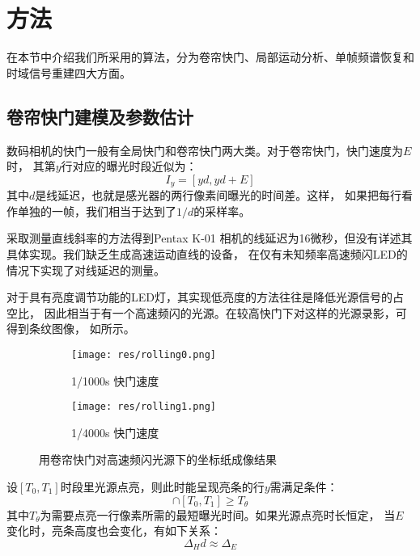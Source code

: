 
\section{方法}

在本节中介绍我们所采用的算法，分为卷帘快门、局部运动分析、单帧频谱恢复和
时域信号重建四大方面。

\subsection{卷帘快门建模及参数估计\label{sec:rolling-shutter}}
数码相机的快门一般有全局快门和卷帘快门两大类。对于卷帘快门，快门速度为$E$时，
其第$y$行对应的曝光时段近似为：
\begin{equation}
    I_y = [yd, yd+E]
\end{equation}
其中$d$是线延迟，也就是感光器的两行像素间曝光的时间差。这样，
如果把每行看作单独的一帧，我们相当于达到了$1/d$的采样率。

\cite{Davis2014VisualMic}采取测量直线斜率的方法得到Pentax K-01
相机的线延迟为16微秒，但没有详述其具体实现。我们缺乏生成高速运动直线的设备，
在仅有未知频率高速频闪LED的情况下实现了对线延迟的测量。

对于具有亮度调节功能的LED灯，其实现低亮度的方法往往是降低光源信号的占空比，
因此相当于有一个高速频闪的光源。在较高快门下对这样的光源录影，可得到条纹图像，
如所示。
\begin{figure}[h!]\begin{center}
    \begin{subfigure}[b]{.5\figwidth}
        \centering
        \texttt{[image: res/rolling0.png]}
        \caption{1/1000s 快门速度}
    \end{subfigure}
    \begin{subfigure}[b]{.5\figwidth}
        \centering
        \texttt{[image: res/rolling1.png]}
        \caption{1/4000s 快门速度}
    \end{subfigure}
    \caption{用卷帘快门对高速频闪光源下的坐标纸成像结果
        \label{fig:rolling-shutter-record}}
\end{center}\end{figure}

设$[T_0, T_1]$时段里光源点亮，则此时能呈现亮条的行$y$需满足条件：
\begin{equation}
    [yd, yd+E] \cap [T_0, T_1] \ge T_\theta
\end{equation}
其中$T_\theta$为需要点亮一行像素所需的最短曝光时间。如果光源点亮时长恒定，
当$E$变化时，亮条高度也会变化，有如下关系：
\begin{equation}
    \Delta_H d \approx \Delta_E
\end{equation}

